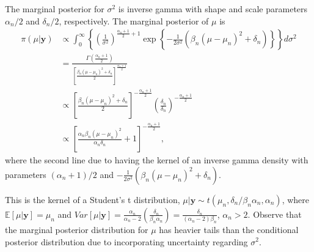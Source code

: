 \begin{enumerate}
The marginal posterior for $\sigma^2$ is inverse gamma with shape and scale parameters $\alpha_n/2$ and $\delta_n/2$, respectively. The marginal posterior of $\mu$ is
\begin{align}
	\pi(\mu|\bm{y})&\propto \int_{0}^{\infty}\left\{ \left(\frac{1}{\sigma^2}\right)^{\frac{\alpha_n+1}{2}+1}\exp\left\{-\frac{1}{2\sigma^2}(\beta_n(\mu-\mu_n)^2+\delta_n)\right\}\right\}d\sigma^2\nonumber\\
	&=\frac{\Gamma\left(\frac{\alpha_n+1}{2}\right)}{\left[\frac{\beta_n(\mu-\mu_n)^2+\delta_n}{2}\right]^{\frac{\alpha_n+1}{2}}}\nonumber\\
	&\propto \left[\frac{\beta_n(\mu-\mu_n)^2+\delta_n}{2}\right]^{-\frac{\alpha_n+1}{2}}\left(\frac{\delta_n}{\delta_n}\right)^{-\frac{\alpha_n+1}{2}}\nonumber\\
	&\propto \left[\frac{\alpha_n\beta_n(\mu-\mu_n)^2}{\alpha_n\delta_n}+1\right]^{-\frac{\alpha_n+1}{2}},\nonumber
\end{align}
where the second line due to having the kernel of an inverse gamma density with parameters $(\alpha_n+1)/2$ and $-\frac{1}{2\sigma^2}(\beta_n(\mu-\mu_n)^2+\delta_n)$.

This is the kernel of a Student's t distribution, $\mu|\bm{y}\sim t(\mu_n,\delta_n/\beta_n\alpha_n,\alpha_n)$, where $\mathbb{E}[\mu|\bm{y}]=\mu_n$ and $Var[\mu|\bm{y}]=\frac{\alpha_n}{\alpha_n-2}\left(\frac{\delta_n}{\beta_n\alpha_n}\right)=\frac{\delta_n}{(\alpha_n-2)\beta_n}$, $\alpha_n>2$. Observe that the marginal posterior distribution for $\mu$ has heavier tails than the conditional posterior distribution due to incorporating uncertainty regarding $\sigma^2$.


\end{enumerate}
